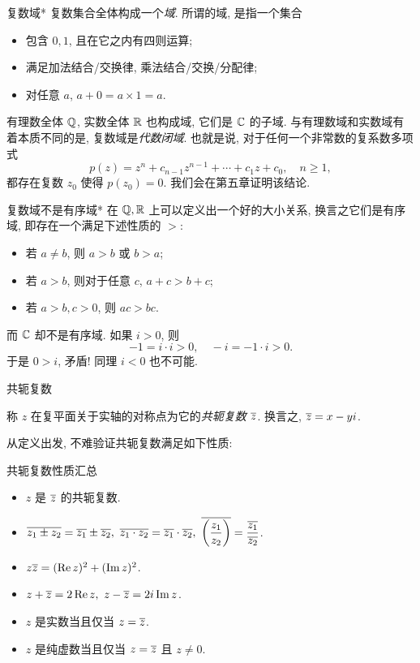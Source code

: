 \begin{frame}{复数域*}
\onslide<+->复数集合全体构成一个\emph{域}.
\onslide<+->所谓的域, 是指一个集合
\begin{itemize}
\item 包含 $0,1$, 且在它之内有四则运算;
\item 满足加法结合/交换律, 乘法结合/交换/分配律;
\item 对任意 $a$, $a+0=a\times 1=a$.
\end{itemize}
\onslide<+->有理数全体 ${\mathbb{Q}}$, 实数全体 ${\mathbb{R}}$ 也构成域, 它们是 ${\mathbb{C}}$ 的子域.
\onslide<+->与有理数域和实数域有着本质不同的是, 复数域是\emph{代数闭域}.
\onslide<+->也就是说, 对于任何一个非常数的复系数多项式
	\[p(z)=z^n+c_{n-1}z^{n-1}+\cdots+c_1z+c_0,\quad n\ge 1,\]
\onslide<+->都存在复数 $z_0$ 使得 $p(z_0)=0$.
\onslide<+->我们会在第五章证明该结论.
\end{frame}


\begin{frame}{复数域不是有序域*}
\onslide<+->在 ${\mathbb{Q}},{\mathbb{R}}$ 上可以定义出一个好的大小关系,
\onslide<+->换言之它们是有序域, 即存在一个满足下述性质的 $>$:
\begin{itemize}
\item 若 $a\neq b$, 则 $a>b$ 或 $b>a$;
\item 若 $a>b$, 则对于任意 $c$, $a+c>b+c$;
\item 若 $a>b,c>0$, 则 $ac>bc$.
\end{itemize}
\onslide<+->而 ${\mathbb{C}}$ 却不是有序域.
\onslide<+->如果 $i>0$, 则
	\[-1=i\cdot i>0,\quad -i=-1\cdot i>0.\]
\onslide<+->于是 $0>i$, 矛盾! 同理 $i<0$ 也不可能.
\end{frame}


\begin{frame}{共轭复数}
\onslide<+->
\begin{definition}
称 $z$ 在复平面关于实轴的对称点为它的\emph{共轭复数 $\overline z$}.
换言之, $\overline z=x-yi$.
\end{definition}
\onslide<+->从定义出发, 不难验证共轭复数满足如下性质:
\onslide<+->
\begin{block}{共轭复数性质汇总}
\begin{itemize}
\item $z$ 是 $\overline z$ 的共轭复数.
\item $\ov{z_1\pm z_2}=\ov{z_1}\pm\ov{z_2},\ 
\ov{z_1\cdot z_2}=\ov{z_1}\cdot\ov{z_2},\ 
\ov{\left(\dfrac{z_1}{z_2}\right)}=\dfrac{\ov{z_1}}{\ov{z_2}}$.
\item $z\overline{z}=(\operatorname{Re} z)^2+(\operatorname{Im} z)^2$.
\item $z+\overline z=2\operatorname{Re} z,\ z-\overline z=2i\operatorname{Im} z$.
\item $z$ 是实数当且仅当 $z=\overline z$.
\item $z$ 是纯虚数当且仅当 $z=\overline z$ 且 $z\neq 0$.
\end{itemize}
\end{block}
\end{frame}


